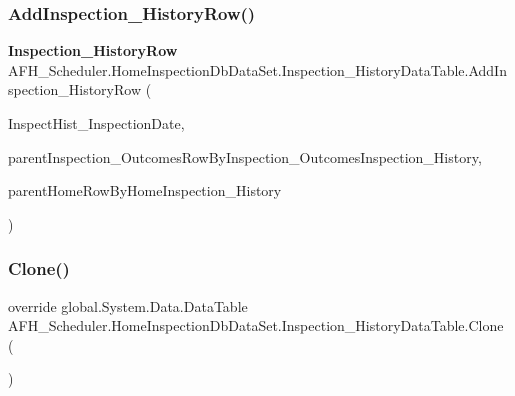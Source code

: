 \mbox{\label{class_a_f_h___scheduler_1_1_home_inspection_db_data_set_1_1_inspection___history_data_table_a19a92b92af1eb00d0caa1acd7b71fbee}} 
\subsubsection{AddInspection\_HistoryRow()\hspace{0.1cm}{\footnotesize\ttfamily [2/2]}}
{\footnotesize\ttfamily \textbf{ Inspection\+\_\+\+History\+Row} A\+F\+H\+\_\+\+Scheduler.\+Home\+Inspection\+Db\+Data\+Set.\+Inspection\+\_\+\+History\+Data\+Table.\+Add\+Inspection\+\_\+\+History\+Row (\begin{DoxyParamCaption}\item[{System.\+Date\+Time}]{Inspect\+Hist\+\_\+\+Inspection\+Date,  }\item[{\textbf{ Inspection\+\_\+\+Outcomes\+Row}}]{parent\+Inspection\+\_\+\+Outcomes\+Row\+By\+Inspection\+\_\+\+Outcomes\+Inspection\+\_\+\+History,  }\item[{\textbf{ Home\+Row}}]{parent\+Home\+Row\+By\+Home\+Inspection\+\_\+\+History }\end{DoxyParamCaption})}

\mbox{\label{class_a_f_h___scheduler_1_1_home_inspection_db_data_set_1_1_inspection___history_data_table_acaff3b174c4068119736503f75e520dd}} 
\subsubsection{Clone()}
{\footnotesize\ttfamily override global.\+System.\+Data.\+Data\+Table A\+F\+H\+\_\+\+Scheduler.\+Home\+Inspection\+Db\+Data\+Set.\+Inspection\+\_\+\+History\+Data\+Table.\+Clone (\begin{DoxyParamCaption}{ }\end{DoxyParamCaption})}


